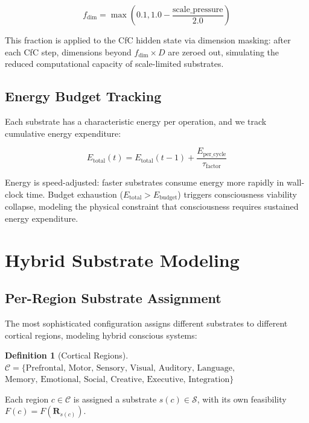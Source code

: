 \documentclass[12pt,a4paper]{article}
\newtheorem{definition}{Definition}
\begin{document}
\begin{equation}
f_{\text{dim}} = \max\left(0.1, 1.0 - \frac{\text{scale\_pressure}}{2.0}\right)
\end{equation}

This fraction is applied to the CfC hidden state via dimension masking: after each CfC step, dimensions beyond $f_{\text{dim}} \times D$ are zeroed out, simulating the reduced computational capacity of scale-limited substrates.

\subsection{Energy Budget Tracking}

Each substrate has a characteristic energy per operation, and we track cumulative energy expenditure:

\begin{equation}
E_{\text{total}}(t) = E_{\text{total}}(t-1) + \frac{E_{\text{per\_cycle}}}{\tau_{\text{factor}}}
\end{equation}

Energy is speed-adjusted: faster substrates consume energy more rapidly in wall-clock time. Budget exhaustion ($E_{\text{total}} > E_{\text{budget}}$) triggers consciousness viability collapse, modeling the physical constraint that consciousness requires sustained energy expenditure.

\section{Hybrid Substrate Modeling}

\subsection{Per-Region Substrate Assignment}

The most sophisticated configuration assigns different substrates to different cortical regions, modeling hybrid conscious systems:

\begin{definition}[Cortical Regions]
$\mathcal{C} = \{\text{Prefrontal, Motor, Sensory, Visual, Auditory, Language,}$ $\text{Memory, Emotional, Social, Creative, Executive, Integration}\}$
\end{definition}

Each region $c \in \mathcal{C}$ is assigned a substrate $s(c) \in \mathcal{S}$, with its own feasibility $F(c) = F(\mathbf{R}_{s(c)})$.
\end{document}
